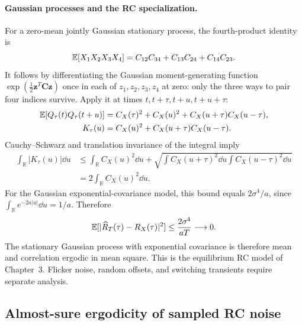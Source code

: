 \paragraph{Gaussian processes and the RC specialization.}

For a zero-mean jointly Gaussian stationary process, the fourth-product identity is
\[
\mathbb E[X_1X_2X_3X_4]=C_{12}C_{34}+C_{13}C_{24}+C_{14}C_{23}.
\]
It follows by differentiating the Gaussian moment-generating function
$\exp(\tfrac12\bm z^T\bm C\bm z)$ once in each of $z_1,z_2,z_3,z_4$ at zero: only the three ways to pair four indices survive. Apply it at times $t,t+\tau,t+u,t+u+\tau$:
\begin{align*}
\mathbb E[Q_\tau(t)Q_\tau(t+u)]
&=C_X(\tau)^2+C_X(u)^2+C_X(u+\tau)C_X(u-\tau),\\
K_\tau(u)&=C_X(u)^2+C_X(u+\tau)C_X(u-\tau).
\end{align*}
Cauchy--Schwarz and translation invariance of the integral imply
\begin{align*}
\int_{\mathbb R}|K_\tau(u)|\dd u
&\leq\int_{\mathbb R}C_X(u)^2\dd u
+\sqrt{\int C_X(u+\tau)^2\dd u\int C_X(u-\tau)^2\dd u}\\
&=2\int_{\mathbb R}C_X(u)^2\dd u.
\end{align*}
For the Gaussian exponential-covariance model, this bound equals $2\sigma^4/a$, since $\int_{\mathbb R}e^{-2a|u|}\dd u=1/a$. Therefore
\[
\mathbb E[|\widehat R_T(\tau)-R_X(\tau)|^2]\leq\frac{2\sigma^4}{aT}\longrightarrow0.
\]
The stationary Gaussian process with exponential covariance is therefore mean and correlation ergodic in mean square. This is the equilibrium RC model of Chapter~3. Flicker noise, random offsets, and switching transients require separate analysis.


\subsection{Almost-sure ergodicity of sampled RC noise}
\label{app:almost-sure}

